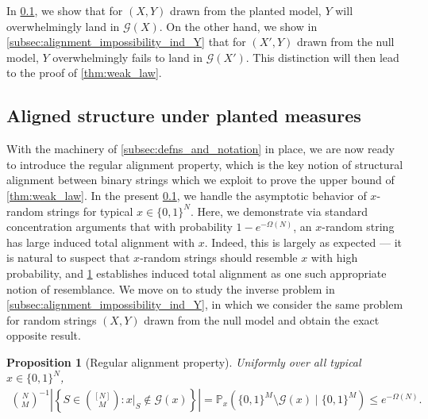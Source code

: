 \documentclass[11pt]{amsart}
\numberwithin{equation}{section}
\numberwithin{equation}{section}
\newcommand{\1}{\mathbbm{1}}
\newcommand{\Prob}{\mathbb{P}}
\newtheorem{proposition}[theorem]{Proposition}
\theoremstyle{definition}
\begin{document}
In \cref{subsec:alignment_W_random_Y}, we show that for $(X,Y)$ drawn from the planted model, $Y$ will overwhelmingly land in $\mathcal G(X)$. On the other hand, we show in \cref{subsec:alignment_impossibility_ind_Y} that for $(X',Y)$ drawn from the null model, $Y$ overwhelmingly fails to land in $\mathcal G(X')$. This distinction will then lead to the proof of \cref{thm:weak_law}.

\subsection{Aligned structure under planted measures} \label{subsec:alignment_W_random_Y}

With the machinery of \cref{subsec:defns_and_notation} in place, we are now ready to introduce the regular alignment property, which is the key notion of structural alignment between binary strings which we exploit to prove the upper bound of \cref{thm:weak_law}. In the present \cref{subsec:alignment_W_random_Y}, we handle the asymptotic behavior of $x$-random strings for typical $x \in \{0,1\}^N$. Here, we demonstrate via standard concentration arguments that with probability $1 - e^{-\Omega(N)}$, an $x$-random string has large induced total alignment with $x$. Indeed, this is largely as expected --- it is natural to suspect that $x$-random strings should resemble $x$ with high probability, and \cref{prop:regular_alignment_property} establishes induced total alignment as one such appropriate notion of resemblance. We move on to study the inverse problem in \cref{subsec:alignment_impossibility_ind_Y}, in which we consider the same problem for random strings $(X,Y)$ drawn from the null model and obtain the exact opposite result.

\begin{proposition}[Regular alignment property] \label{prop:regular_alignment_property}
    Uniformly over all typical $x \in \{0,1\}^{N}$,
    \begin{align} \label{eq:regular_alignment_property_statement}
        \binom{N}{M}^{-1} \left| \left\{ S \in \binom{[N]}{M}: x|_S \notin \mathcal G(x) \right\} \right| = \Prob_x\!\left( \{0,1\}^M \setminus \mathcal G(x) \mid \{0,1\}^M \right) \leq e^{-\Omega(N)}.
    \end{align}
\end{proposition}
\end{document}
